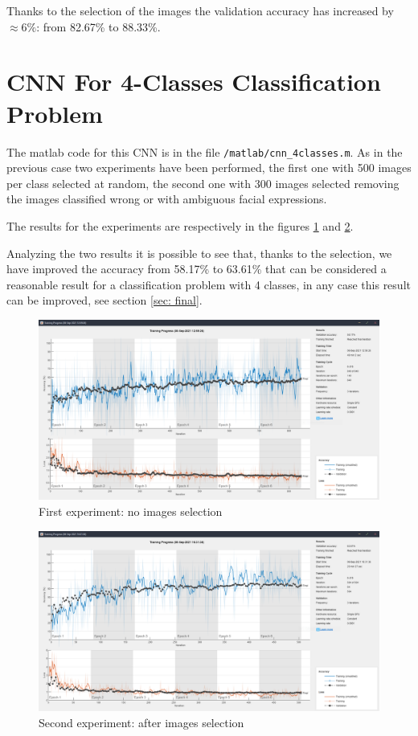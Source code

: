 \documentclass[a4paper]{report}
\begin{document}
	\noindent Thanks to the selection of the images the validation accuracy has increased by $\approx 6\%$: from 82.67\% to 88.33\%.
	 
	\section{CNN For 4-Classes Classification Problem}
	\noindent The matlab code for this CNN is in the file \texttt{/matlab/cnn\_4classes.m}. As in the previous case two experiments have been performed, the first one with 500 images per class selected at random, the second one with 300 images selected removing the images classified wrong or with ambiguous facial expressions.
	
	\noindent The results for the experiments are respectively in the figures \ref{img: trainingCnnFourClasses} and \ref{img: trainingCnnFourClassesAfterSelection}.
	
	\noindent Analyzing the two results it is possible to see that, thanks to the selection, we have improved the accuracy from 58.17\% to 63.61\% that can be considered a reasonable result for a classification problem with 4 classes, in any case this result can be improved, see section \ref{sec: final}.
	
	\begin{figure}[htbp]
		\centering
		\includegraphics[scale=0.31]{img/trainingCnnFourClasses.png}
		\caption{First experiment: no images selection}
		\label{img: trainingCnnFourClasses}
	\end{figure}
	
	\begin{figure}[htbp]
		\centering
		\includegraphics[scale=0.31]{img/trainingCnnFourClasses_afterSelection.png}
		\caption{Second experiment: after images selection}
		\label{img: trainingCnnFourClassesAfterSelection}
	\end{figure}
	
\end{document}
